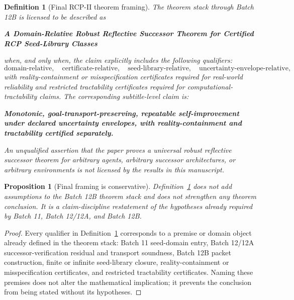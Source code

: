 \documentclass[11pt]{article}
\newtheorem{proposition}[theorem]{Proposition}
\newtheorem{definition}[theorem]{Definition}
\newcommand{\1}{\mathbf{1}}
\begin{document}
\begin{definition}[Final RCP-II theorem framing]
\label{def:rcp2_final_theorem_framing}
The theorem stack through Batch 12B is licensed to be described as
\begin{center}
\textbf{A Domain-Relative Robust Reflective Successor Theorem for Certified RCP Seed-Library Classes}
\end{center}
when, and only when, the claim explicitly includes the following qualifiers:
\[
\text{domain-relative},\quad
\text{certificate-relative},\quad
\text{seed-library-relative},\quad
\text{uncertainty-envelope-relative},
\]
with reality-containment or misspecification certificates required for real-world reliability and restricted tractability certificates required for computational-tractability claims. The corresponding subtitle-level claim is:
\begin{center}
\textbf{Monotonic, goal-transport-preserving, repeatable self-improvement under declared uncertainty envelopes, with reality-containment and tractability certified separately.}
\end{center}
An unqualified assertion that the paper proves a universal robust reflective successor theorem for arbitrary agents, arbitrary successor architectures, or arbitrary environments is not licensed by the results in this manuscript.
\end{definition}

\begin{proposition}[Final framing is conservative]
\label{prop:rcp2_final_framing_conservative}
Definition~\ref{def:rcp2_final_theorem_framing} does not add assumptions to the Batch 12B theorem stack and does not strengthen any theorem conclusion. It is a claim-discipline restatement of the hypotheses already required by Batch 11, Batch 12/12A, and Batch 12B.
\end{proposition}

\begin{proof}
Every qualifier in Definition~\ref{def:rcp2_final_theorem_framing} corresponds to a premise or domain object already defined in the theorem stack: Batch 11 seed-domain entry, Batch 12/12A successor-verification residual and transport soundness, Batch 12B packet construction, finite or infinite seed-library closure, reality-containment or misspecification certificates, and restricted tractability certificates. Naming these premises does not alter the mathematical implication; it prevents the conclusion from being stated without its hypotheses.
\end{proof}
\end{document}
